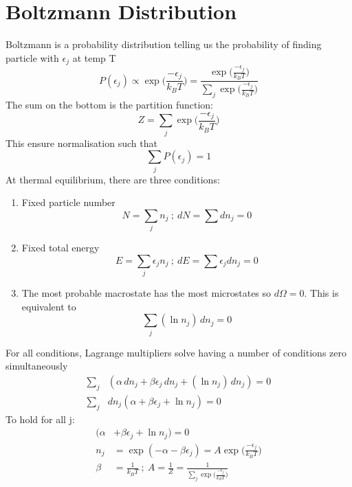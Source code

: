 \documentclass[a4paper, 11pt, normalem]{report}
\begin{document}
\section{Boltzmann Distribution}
Boltzmann is a probability distribution telling us the probability of finding particle with $\epsilon_j$ at temp T
\begin{equation*}
    P(\epsilon_j) \propto \exp\Big(\frac{-\epsilon_j}{k_B T}\Big) = \frac{\exp\big(\tfrac{-\epsilon_j}{k_B T}\big)}{\sum_{j} \exp\big(\tfrac{-\epsilon_j}{k_B T}\big)}
\end{equation*}
The sum on the bottom is the partition function:
\begin{equation*}
    Z = \sum_{j} \exp\Big(\frac{-\epsilon_j}{k_B T}\Big)
\end{equation*}
This ensure normalisation such that
\begin{equation*}
    \sum_{j} P(\epsilon_j) = 1
\end{equation*}
At thermal equilibrium, there are three conditions:
\begin{enumerate}
    \item Fixed particle number
            \begin{equation*}
                N = \sum_j n_j ~;~ dN = \sum dn_j = 0
            \end{equation*}
    \item Fixed total energy
            \begin{equation*}
                E = \sum_{j} \epsilon_j n_j ~;~ dE = \sum \epsilon_j dn_j = 0
            \end{equation*}
    \item The most probable macrostate has the most microstates so $d\Omega = 0$. This is equivalent to
            \begin{equation*}
                \sum_{j} (\ln n_j)\,dn_j = 0
            \end{equation*}
\end{enumerate}
For all conditions, Lagrange multipliers solve having a number of conditions zero simultaneously
\begin{align*}
    \sum_{j}& (\alpha\,dn_j + \beta\epsilon_j\,dn_j + (\ln n_j)\,dn_j) = 0 \\
    \sum_{j}& dn_j (\alpha + \beta\epsilon_j + \ln n_j) = 0
\end{align*}
To hold for all j:
\begin{align*}
    (\alpha &+ \beta\epsilon_j + \ln n_j) = 0 \\
    n_j &= \exp(-\alpha - \beta\epsilon_j) = A\exp\Big(\frac{-\epsilon_j}{k_B T}\Big) \\
    \beta &= \frac{1}{k_B T} ~;~ A = \frac{1}{Z} = \frac{1}{\sum_{j} \exp\big(\tfrac{-\epsilon_j}{k_B T}\big)}
\end{align*}
\end{document}
